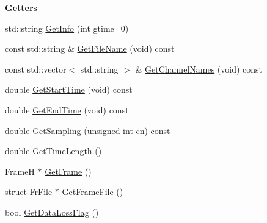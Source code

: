 \begin{Indent}\textbf{ Getters}\par
\begin{DoxyCompactItemize}
\item 
std\+::string \hyperlink{classtsa_1_1_frame_i_stream_a3a199e1e8993581115311de3164550cc}{Get\+Info} (int gtime=0)
\item 
const std\+::string \& \hyperlink{classtsa_1_1_frame_i_stream_aa5e27458593c788665c737f40c445bf4}{Get\+File\+Name} (void) const
\item 
const std\+::vector$<$ std\+::string $>$ \& \hyperlink{classtsa_1_1_frame_i_stream_a0f65554481bf64cab44c7f5cbddb1987}{Get\+Channel\+Names} (void) const
\item 
double \hyperlink{classtsa_1_1_frame_i_stream_a88781ac3b80bddcca52e252f416009a6}{Get\+Start\+Time} (void) const
\item 
double \hyperlink{classtsa_1_1_frame_i_stream_a2b54726738d6155f6e4ccbae2b4a3f8f}{Get\+End\+Time} (void) const
\item 
double \hyperlink{classtsa_1_1_frame_i_stream_a02a205a02b70055814056216951476a6}{Get\+Sampling} (unsigned int cn) const
\item 
double \hyperlink{classtsa_1_1_frame_i_stream_aa9cae02ea01e99c39ba6a9da12fa8a21}{Get\+Time\+Length} ()
\item 
FrameH $\ast$ \hyperlink{classtsa_1_1_frame_i_stream_a7719f5fb6f7adc5b96555728489b5df6}{Get\+Frame} ()
\item 
struct Fr\+File $\ast$ \hyperlink{classtsa_1_1_frame_i_stream_a9ecf2c1985bf7578f70e0bef5ac993b3}{Get\+Frame\+File} ()
\item 
bool \hyperlink{classtsa_1_1_frame_i_stream_abdd07c781d107408f1b3e800e7fab42f}{Get\+Data\+Loss\+Flag} ()
\end{DoxyCompactItemize}
\end{Indent}
